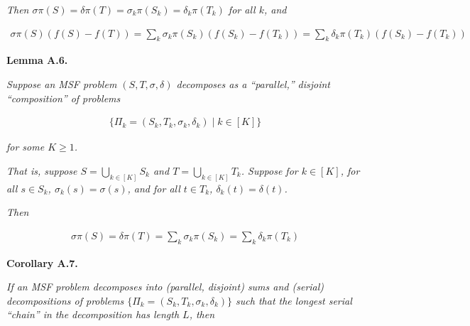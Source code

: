 \emph{Then
$\sigma\pi(S)=\delta\pi(T)=\sigma_{k}\pi(S_{k})=\delta_{k}\pi(T_{k})$ for all $k$, and}\par


\[\begin{gathered}
\sigma\pi(S)(f(S)-f(T))=\sum_{k}\sigma_{k}\pi(S_{k})(f(S_{k})-f(T_{k}))=\sum_{k}\delta_{k}\pi(T_{k})(f(S_{k})-f(T_{k}))
\end{gathered}\]







\par\medskip\noindent\textbf{\textbf{Lemma A.6}\textbf{.}}\par



\emph{Suppose an MSF problem $(S,T,\sigma,\delta)$ decomposes as a “parallel,” disjoint “composition” of problems}\par


\[\begin{gathered}
\{\Pi_{k}=(S_{k},T_{k},\sigma_{k},\delta_{k})\mid k\in[K]\}
\end{gathered}\]


\emph{for some $K\geq 1$.}\par




\emph{That is, suppose $S=\bigcup_{k\in[K]}S_{k}$ and $T=\bigcup_{k\in[K]}T_{k}$. Suppose for $k\in[K]$, for all $s\in S_{k}$, $\sigma_{k}(s)=\sigma(s)$, and for all $t\in T_{k}$, $\delta_{k}(t)=\delta(t)$.}\par




\emph{Then}\par


\[\begin{gathered}
\sigma\pi(S)=\delta\pi(T)=\sum_{k}\sigma_{k}\pi(S_{k})=\sum_{k}\delta_{k}\pi(T_{k})
\end{gathered}\]







\par\medskip\noindent\textbf{\textbf{Corollary A.7}\textbf{.}}\par



\emph{If an MSF problem decomposes into (parallel, disjoint) sums and (serial) decompositions of problems $\{\Pi_{k}=(S_{k},T_{k},\sigma_{k},\delta_{k})\}$ such that the longest serial “chain” in the decomposition has length $L$, then}\par


